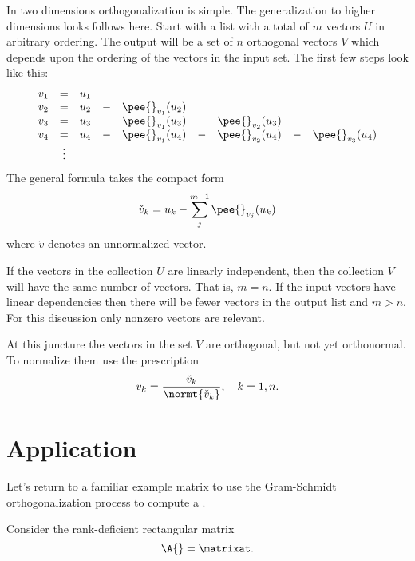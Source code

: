 In two dimensions orthogonalization is simple. The generalization to higher dimensions looks follows here. Start with a list with a total of $m$ vectors $U$ in arbitrary ordering. The output will be a set of $n$ orthogonal vectors $V$ which depends upon the ordering of the vectors in the input set. The first few steps look like this:
\begin{equation}
  \begin{array}{cccccccccc}
    v_{1} &=& u_{1}\\
    v_{2} &=& u_{2} &-& \pee{}_{v_{1}}(u_{2})\\
    v_{3} &=& u_{3} &-& \pee{}_{v_{1}}(u_{3}) &-& \pee{}_{v_{2}}(u_{3})\\
    v_{4} &=& u_{4} &-& \pee{}_{v_{1}}(u_{4}) &-& \pee{}_{v_{2}}(u_{4}) &-& \pee{}_{v_{3}}(u_{4})\\
     & \vdots
  \end{array}
\end{equation}
The general formula takes the compact form
\begin{equation}
  \check{v}_{k} = u_{k} - \sum_{j}^{m-1}{\pee{}_{v_{j}}(u_{k})}
\end{equation}
where $\check{v}$ denotes an unnormalized vector.

If the vectors in the collection $U$ are linearly independent, then the collection $V$ will have the same number of vectors. That is, $m=n$. If the input vectors have linear dependencies then there will be fewer vectors in the output list and $m>n$. For this discussion only nonzero vectors are relevant.
 
At this juncture the vectors in the set $V$ are orthogonal, but not yet orthonormal. To normalize them use the prescription
\begin{equation}
  v_{k} = \frac{\check{v}_{k}}{\normt{\check{v}_{k}}}, \quad k=1,n.
\end{equation}

\section{Application}
Let's return to a familiar example matrix to use the Gram-Schmidt orthogonalization process to compute a \asvd.

Consider the rank-deficient rectangular matrix
\begin{equation}
  \A{} = \matrixat.
\end{equation}

